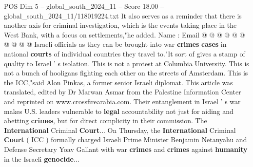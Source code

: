 \begin{textsample}{POS Dim 5 – global\_south\_2024\_11 – Score 18.00 – global\_south\_2024\_11/118019224.txt}
It also serves as a reminder that there is another axis for criminal investigation, which is the events taking place in the West Bank, with a focus on settlements,"he added.
Name : Email @ @ @ @ @ @ @ @ @ @ Israeli officials as they can be brought into war \textbf{crimes} \textbf{cases} in national \textbf{courts} of individual countries they travel to."It sort of gives a stamp of quality to Israel ' s isolation.
This is not a protest at Columbia University.
This is not a bunch of hooligans fighting each other on the streets of Amsterdam.
This is the ICC,"said Alon Pinkas, a former senior Israeli diplomat.
This article was translated, edited by Dr Marwan Asmar from the Palestine Information Center and reprinted on www.crossfirearabia.com.
Their entanglement in Israel ' s war makes U.S. leaders vulnerable to \textbf{legal} accountability not just for aiding and abetting \textbf{crimes}, but for direct complicity in their commission.
The \textbf{International} Criminal \textbf{Court}...
On Thursday, the \textbf{International} Criminal \textbf{Court} ( ICC ) formally charged Israeli Prime Minister Benjamin Netanyahu and Defense Secretary Yoav Gallant with war \textbf{crimes} and \textbf{crimes} against \textbf{humanity} in the Israeli \textbf{genocide}...

\end{textsample}
